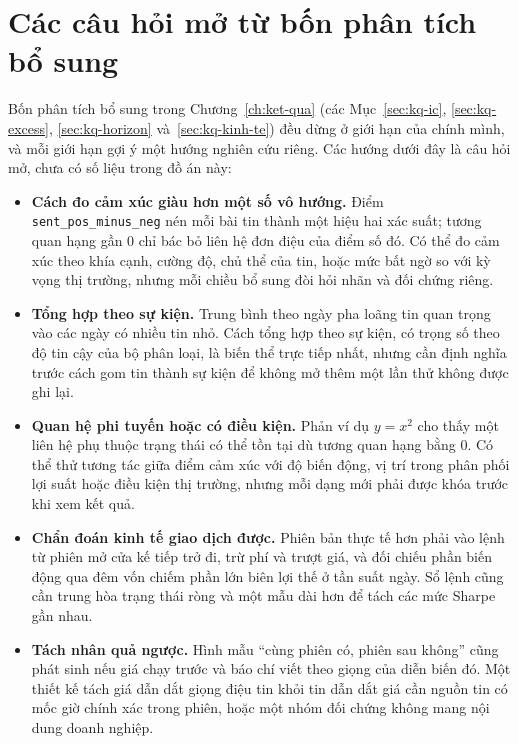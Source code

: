 \section{Các câu hỏi mở từ bốn phân tích bổ sung}

Bốn phân tích bổ sung trong Chương~\ref{ch:ket-qua} (các Mục~\ref{sec:kq-ic},
\ref{sec:kq-excess}, \ref{sec:kq-horizon} và~\ref{sec:kq-kinh-te}) đều dừng ở
giới hạn của chính mình, và mỗi giới hạn gợi ý một hướng nghiên cứu riêng. Các
hướng dưới đây là câu hỏi mở, chưa có số liệu trong đồ án này:

\begin{itemize}[nosep]
  \item \textbf{Cách đo cảm xúc giàu hơn một số vô hướng.} Điểm
        \texttt{sent\_pos\_minus\_neg} nén mỗi bài tin thành một hiệu hai xác
        suất; tương quan hạng gần 0 chỉ bác bỏ liên hệ đơn điệu của điểm số đó.
        Có thể đo cảm xúc theo khía cạnh, cường độ, chủ thể của tin, hoặc mức
        bất ngờ so với kỳ vọng thị trường, nhưng mỗi chiều bổ sung đòi hỏi nhãn
        và đối chứng riêng.
  \item \textbf{Tổng hợp theo sự kiện.} Trung bình theo ngày pha loãng tin quan
        trọng vào các ngày có nhiều tin nhỏ. Cách tổng hợp theo sự kiện, có
        trọng số theo độ tin cậy của bộ phân loại, là biến thể trực tiếp nhất,
        nhưng cần định nghĩa trước cách gom tin thành sự kiện để không mở thêm
        một lần thử không được ghi lại.
  \item \textbf{Quan hệ phi tuyến hoặc có điều kiện.} Phản ví dụ $y = x^2$ cho
        thấy một liên hệ phụ thuộc trạng thái có thể tồn tại dù tương quan hạng
        bằng 0. Có thể thử tương tác giữa điểm cảm xúc với độ biến động, vị trí
        trong phân phối lợi suất hoặc điều kiện thị trường, nhưng mỗi dạng mới
        phải được khóa trước khi xem kết quả.
  \item \textbf{Chẩn đoán kinh tế giao dịch được.} Phiên bản thực tế hơn phải
        vào lệnh từ phiên mở cửa kế tiếp trở đi, trừ phí và trượt giá, và đối
        chiếu phần biến động qua đêm vốn chiếm phần lớn biên lợi thế ở tần suất
        ngày. Sổ lệnh cũng cần trung hòa trạng thái ròng và một mẫu dài hơn để
        tách các mức Sharpe gần nhau.
  \item \textbf{Tách nhân quả ngược.} Hình mẫu ``cùng phiên có, phiên sau
        không'' cũng phát sinh nếu giá chạy trước và báo chí viết theo giọng của
        diễn biến đó. Một thiết kế tách giá dẫn dắt giọng điệu tin khỏi tin dẫn
        dắt giá cần nguồn tin có mốc giờ chính xác trong phiên, hoặc một nhóm
        đối chứng không mang nội dung doanh nghiệp.
\end{itemize}


